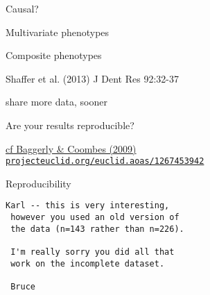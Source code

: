 \documentclass[12pt,t]{beamer}
\begin{document}
\begin{frame}[c]{Causal?}
\end{frame}



\begin{frame}[c]{Multivariate phenotypes}
\end{frame}



\begin{frame}{Composite phenotypes}

\vspace{7mm}


\vspace{7mm}

\hfill {\scriptsize \color{lolit} Shaffer et al. (2013) J Dent Res 92:32-37}

\end{frame}



\begin{frame}[c]{}
  \centerline{\Large share more data, sooner}
\end{frame}



\begin{frame}[c]{}

  \vspace{35mm}

  \centerline{\Large Are your results reproducible?}

  \vspace{35mm}
  \hfill
  \href{https://projecteuclid.org/euclid.aoas/1267453942}
       {\scriptsize \lolit cf Baggerly \& Coombes (2009) \\
         \hfill \tt projecteuclid.org/euclid.aoas/1267453942}

\end{frame}




\begin{frame}[fragile,c]{Reproducibility}

\begin{center}
\begin{minipage}[c]{9.3cm}
\begin{semiverbatim}
\lstset{basicstyle=\normalsize}
\begin{lstlisting}[linewidth=9.3cm]
 Karl -- this is very interesting,
 however you used an old version of
 the data (n=143 rather than n=226).

 I'm really sorry you did all that
 work on the incomplete dataset.

 Bruce
\end{lstlisting}
\end{semiverbatim}
\end{minipage}
\end{center}

\end{frame}
\end{document}

